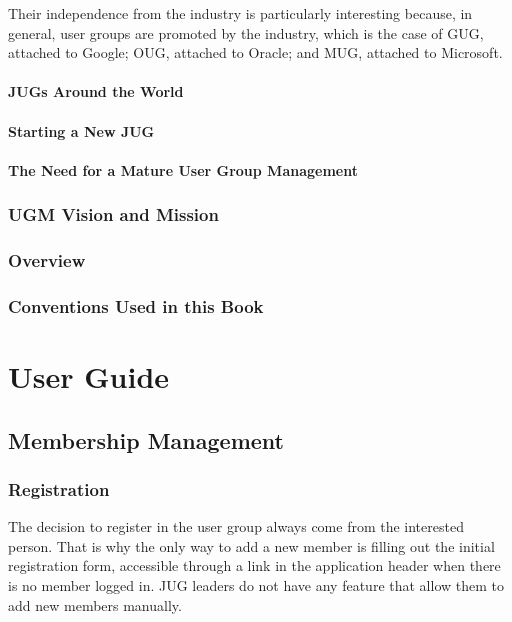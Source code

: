 \documentclass[envcountsame,envcountchap]{svmono}
\begin{document}
Their independence from the industry is particularly interesting because, in general, user groups are promoted by the industry, which is the case of GUG, attached to Google; OUG, attached to Oracle; and MUG, attached to Microsoft.

\subsection{JUGs Around the World}

\subsection{Starting a New JUG}

\subsection{The Need for a Mature User Group Management}

\section{UGM Vision and Mission}

\section{Overview}

\section{Conventions Used in this Book}

\part{User Guide}

\chapter{Membership Management}

\section{Registration}

The decision to register in the user group always come from the interested person. That is why the only way to add a new member is filling out the initial registration form, accessible through a link in the application header when there is no member logged in. JUG leaders do not have any feature that allow them to add new members manually.
\end{document}
